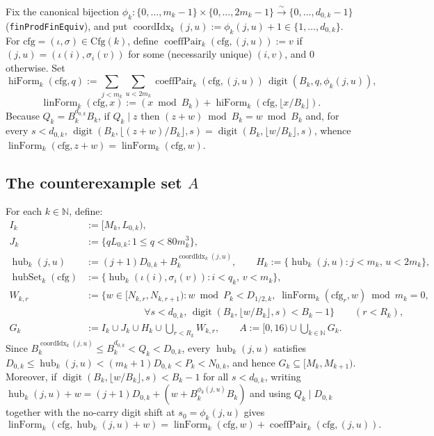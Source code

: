 \documentclass[11pt,a4paper]{amsart}
\newcommand{\digit}{\operatorname{digit}}
\newcommand{\linForm}{\operatorname{linForm}}
\newcommand{\hiForm}{\operatorname{hiForm}}
\newcommand{\coeffPair}{\operatorname{coeffPair}}
\newcommand{\coordIdx}{\operatorname{coordIdx}}
\newcommand{\hub}{\operatorname{hub}}
\newcommand{\hubSet}{\operatorname{hubSet}}
\begin{document}
Fix the canonical bijection $\phi_k : \{0, \dots, m_k - 1\} \times \{0, \dots, 2 m_k - 1\} \xrightarrow{\sim} \{0, \dots, d_{0,k} - 1\}$ (\texttt{finProdFinEquiv}), and put $\coordIdx_k(j, u) := \phi_k(j, u) + 1 \in \{1, \dots, d_{0,k}\}$. For $\mathrm{cfg} = (\iota, \sigma) \in \mathrm{Cfg}(k)$, define $\coeffPair_k(\mathrm{cfg}, (j, u)) := v$ if $(j, u) = (\iota(i), \sigma_i(v))$ for some (necessarily unique) $(i, v)$, and $0$ otherwise. Set
\[
\hiForm_k(\mathrm{cfg}, q) := \sum_{j < m_k} \sum_{u < 2 m_k} \coeffPair_k(\mathrm{cfg}, (j, u)) \, \digit(B_k, q, \phi_k(j, u)),
\]
\[
\linForm_k(\mathrm{cfg}, x) := (x \bmod B_k) + \hiForm_k(\mathrm{cfg}, \lfloor x / B_k \rfloor).
\]
Because $Q_k = B_k^{d_{0,k}} B_k$, if $Q_k \mid z$ then $(z + w) \bmod B_k = w \bmod B_k$ and, for every $s < d_{0,k}$, $\digit(B_k, \lfloor (z + w) / B_k \rfloor, s) = \digit(B_k, \lfloor w / B_k \rfloor, s)$, whence $\linForm_k(\mathrm{cfg}, z + w) = \linForm_k(\mathrm{cfg}, w)$.

\subsection*{\texorpdfstring{The counterexample set $A$}{The counterexample set A}}
For each $k \in \mathbb{N}$, define:
\begin{align*}
I_k &:= [M_k, L_{0,k}), \\
J_k &:= \{q L_{0,k} : 1 \le q < 80 m_k^3\}, \\
\hub_k(j, u) &:= (j + 1) D_{0,k} + B_k^{\coordIdx_k(j, u)}, \qquad H_k := \{\hub_k(j, u) : j < m_k,\, u < 2 m_k\}, \\
\hubSet_k(\mathrm{cfg}) &:= \{\hub_k(\iota(i), \sigma_i(v)) : i < q_k,\, v < m_k\}, \\
W_{k,r} &:= \bigl\{w \in [N_{k,r}, N_{k,r+1}) : w \bmod P_k < D_{1/2,k},\; \linForm_k(\mathrm{cfg}_r, w) \bmod m_k = 0, \\
&\qquad\qquad\qquad \forall s < d_{0,k},\, \digit(B_k, \lfloor w / B_k \rfloor, s) < B_k - 1\bigr\} \qquad (r < R_k), \\
G_k &:= I_k \cup J_k \cup H_k \cup \bigcup_{r < R_k} W_{k,r}, \qquad A := [0, 16) \cup \bigcup_{k \in \mathbb{N}} G_k.
\end{align*}
Since $B_k^{\coordIdx_k(j, u)} \le B_k^{d_{0,k}} < Q_k < D_{0,k}$, every $\hub_k(j, u)$ satisfies $D_{0,k} \le \hub_k(j, u) < (m_k + 1) D_{0,k} < P_k < N_{0,k}$, and hence $G_k \subseteq [M_k, M_{k+1})$. Moreover, if $\digit(B_k, \lfloor w / B_k \rfloor, s) < B_k - 1$ for all $s < d_{0,k}$, writing $\hub_k(j, u) + w = (j + 1) D_{0,k} + (w + B_k^{\phi_k(j, u)} B_k)$ and using $Q_k \mid D_{0,k}$ together with the no-carry digit shift at $s_0 = \phi_k(j, u)$ gives
\begin{equation}\label{eq:hub-shift}
\linForm_k(\mathrm{cfg}, \hub_k(j, u) + w) = \linForm_k(\mathrm{cfg}, w) + \coeffPair_k(\mathrm{cfg}, (j, u)).
\end{equation}
\end{document}
